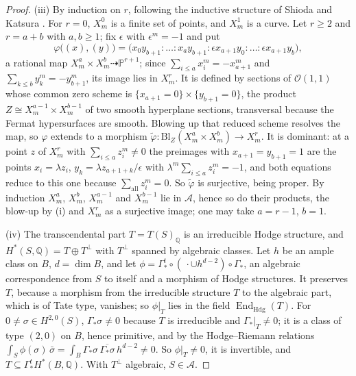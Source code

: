 \documentclass[11pt,reqno]{amsart}
\theoremstyle{plain}
\theoremstyle{definition}
\theoremstyle{remark}
\newcommand{\QQ}{\mathbb{Q}}
\newcommand{\PP}{\mathbb{P}}
\newcommand{\cO}{\mathcal{O}}
\DeclareMathOperator{\End}{End}
\begin{document}
\begin{proof}
(iii) By induction on $r$, following the inductive structure of Shioda and
Katsura \cite{SK79}. For $r=0$, $X^{0}_{m}$ is a finite set of points, and
$X^{1}_{m}$ is a curve. Let $r\ge2$ and $r=a+b$ with $a,b\ge1$; fix
$\epsilon$ with $\epsilon^{m}=-1$ and put
\[
  \varphi\bigl((x),(y)\bigr)=\bigl(x_{0}y_{b+1}:\dots:x_{a}y_{b+1}:
  \epsilon x_{a+1}y_{0}:\dots:\epsilon x_{a+1}y_{b}\bigr),
\]
a rational map $X^{a}_{m}\times X^{b}_{m}\dashrightarrow\PP^{r+1}$; since
$\sum_{i\le a}x_{i}^{m}=-x_{a+1}^{m}$ and $\sum_{k\le b}y_{k}^{m}=-y_{b+1}^{m}$,
its image lies in $X^{r}_{m}$. It is defined by sections of
$\cO(1,1)$ whose common zero scheme is $\{x_{a+1}=0\}\times\{y_{b+1}=0\}$,
the product $Z\cong X^{a-1}_{m}\times X^{b-1}_{m}$ of two smooth
hyperplane sections, transversal because the Fermat hypersurfaces
are smooth. Blowing up that reduced scheme resolves the map, so $\varphi$
extends to a morphism $\widetilde\varphi\colon\mathrm{Bl}_{Z}(X^{a}_{m}\times
X^{b}_{m})\to X^{r}_{m}$. It is dominant: at a point $z$ of $X^{r}_{m}$ with
$\sum_{i\le a}z_{i}^{m}\ne0$ the preimages with $x_{a+1}=y_{b+1}=1$ are the
points $x_{i}=\lambda z_{i}$, $y_{k}=\lambda z_{a+1+k}/\epsilon$ with
$\lambda^{m}\sum_{i\le a}z_{i}^{m}=-1$, and both equations reduce to this one
because $\sum_{\text{all}}z_{i}^{m}=0$. So $\widetilde\varphi$ is surjective,
being proper. By induction $X^{a}_{m}$, $X^{b}_{m}$, $X^{a-1}_{m}$ and
$X^{b-1}_{m}$ lie in $\mathcal{A}$, hence so do their products, the blow-up
by (i) and $X^{r}_{m}$ as a surjective image; one may take $a=r-1$, $b=1$.

(iv) The transcendental part $T=T(S)_{\QQ}$ is an irreducible Hodge
structure, and $H^{*}(S,\QQ)=T\oplus T^{\perp}$ with $T^{\perp}$ spanned by
algebraic classes. Let $h$ be an ample class on $B$, $d=\dim B$, and let
$\phi=\Gamma^{t}_{*}\circ(\,\cdot\cup h^{d-2})\circ\Gamma_{*}$, an algebraic
correspondence from $S$ to itself and a morphism of Hodge structures. It
preserves $T$, because a morphism from the irreducible structure $T$ to the
algebraic part, which is of Tate type, vanishes; so $\phi|_{T}$ lies in the
field $\End_{\mathrm{Hdg}}(T)$. For $0\ne\sigma\in H^{2,0}(S)$,
$\Gamma_{*}\sigma\ne0$ because $T$ is irreducible and $\Gamma_{*}|_{T}\ne0$;
it is a class of type $(2,0)$ on $B$, hence primitive, and by the
Hodge--Riemann relations $\int_{S}\phi(\sigma)\,\bar\sigma=\int_{B}
\Gamma_{*}\sigma\,\overline{\Gamma_{*}\sigma}\,h^{d-2}\ne0$. So
$\phi|_{T}\ne0$, it is invertible, and $T\subseteq\Gamma^{t}_{*}H^{*}(B,\QQ)$.
With $T^{\perp}$ algebraic, $S\in\mathcal{A}$.


\end{proof}
\end{document}
